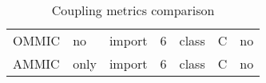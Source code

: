 \begin{table}[p]
\begin{center}
\begin{tabular}{|l|l|l|l|l|l|l|}
    \hline
    \hline
    OMMIC         & no    & import  & 6     & class               & C     & no      \\
    AMMIC         & only  & import  & 6     & class               & C     & no      \\
    \hline
    \end{tabular}
    \end{center}
    \caption{Coupling metrics comparison}
    \label{table:coupling-metrics}
\end{table}
